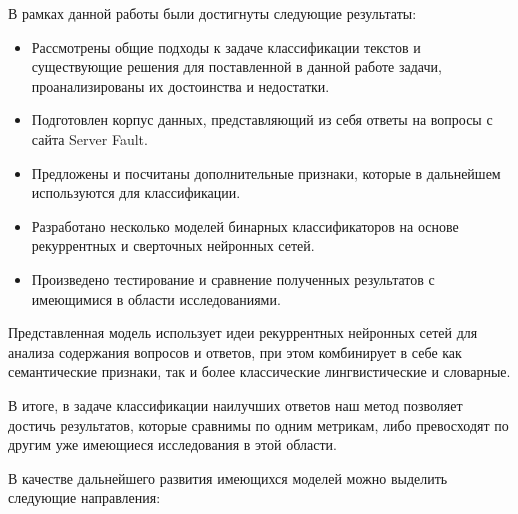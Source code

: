 \documentclass[../diploma.tex]{subfiles}
\begin{document}
	\label{sec:conclusion}

	В рамках данной работы были достигнуты следующие результаты:

	\begin{itemize}
		\item
		Рассмотрены общие подходы к задаче классификации текстов и существующие решения для поставленной в данной работе задачи, проанализированы их достоинства и недостатки.
		                                                                                                                      			
		\item
		Подготовлен корпус данных, представляющий из себя ответы на вопросы с сайта Server Fault.

		\item
		Предложены и посчитаны дополнительные признаки, которые в дальнейшем используются для классификации.

		\item
		Разработано несколько моделей бинарных классификаторов на основе рекуррентных и сверточных нейронных сетей.

		\item
		Произведено тестирование и сравнение полученных результатов с имеющимися в области исследованиями.

	\end{itemize}

	Представленная модель использует идеи рекуррентных нейронных сетей для анализа содержания вопросов и ответов, при этом 
	комбинирует в себе как семантические признаки, так и более классические лингвистические и словарные.
	 
	В итоге, в задаче классификации наилучших ответов наш метод позволяет достичь результатов, 
	которые сравнимы по одним метрикам, либо превосходят по другим уже имеющиеся исследования в этой области.

	В качестве дальнейшего развития имеющихся моделей можно выделить следующие направления:
\end{document}
